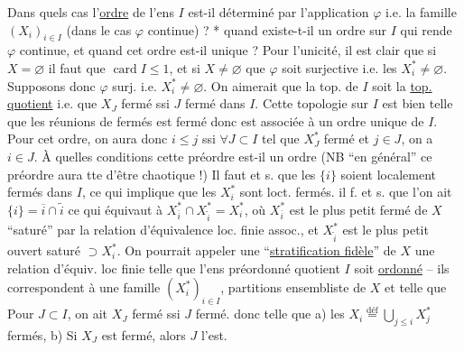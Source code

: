 Dans quels cas l'\uline{ordre} de l'ens $I$ est-il déterminé
par l'application $\varphi$ i.e. la famille $(X_i)_{i\in I}$ (dans le
cas $\varphi$ continue) ? *  
quand  existe-t-il un ordre sur $I$ qui rende $\varphi$
continue, et quand cet ordre est-il unique ?
Pour l'unicité, il est clair que si $X=\varnothing$ il
faut que $\operatorname{card}I\leq1$, et si $X\ne\varnothing$ que $\varphi$ soit
surjective i.e. les $X_i^*\ne\varnothing$. Supposons donc $\varphi$ surj. i.e.
$X_i^*\ne\varnothing$. On aimerait que la top. de $I$ soit la \uline{top.}
\uline{quotient} i.e. que $X_J$ fermé ssi $J$ fermé dans $I$.
Cette topologie sur $I$ est bien telle que les réunions
de fermés est fermé  donc est associée à un ordre
unique de $I$. Pour cet ordre, on aura donc
$i\leq j$ ssi  $\forall J\subset I$ tel que $X_J^*$ fermé et $j\in J$, on
a $i\in J$. À quelles conditions cette préordre est-il
un ordre (NB ``en général'' ce préordre aura tte
 d'être chaotique !) Il faut et s. que
les $\{i\}$ soient localement fermés dans $I$, ce
qui implique que les $X_i^*$ sont loct. fermés.  
  il f. et s. que  l'on ait 
$\{i\}=\overline i\cap\widetilde i$ ce qui équivaut à 
$X_{\overline i}^*\cap X_{\widetilde i}^*=X_i^*$,
où $X_{\overline i}^*$ est le plus petit fermé de $X$  ``saturé'' par la
relation d'équivalence loc. finie assoc., et $X_{\widetilde i}^*$ est le
plus petit ouvert saturé $\supset X_i^*$. On pourrait appeler
une ``\uline{stratification fidèle}'' de $X$ une relation d'équiv.
loc finie telle que l'ens préordonné quotient
$I$ soit \uline{ordonné} -- ils correspondent à une famille
$(X_i^*)_{i\in I}$, partitions ensembliste de $X$ 
 
 et telle que
Pour $J\subset I$, on ait $X_J$ fermé ssi $J$ fermé.
donc telle que a) les $X_i\overset{\mathrm{déf}}=\bigcup_{j\leq i}X_j^*$ fermés,
b) Si $X_J$ est fermé, alors $J$ l'est.
